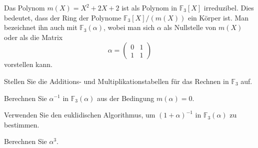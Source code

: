 Das Polynom $m(X)=X^2+2X+2$ ist als Polynom in $\mathbb{F}_3[X]$ irreduzibel.
Dies bedeutet, dass der Ring der Polynome $\mathbb{F}_3[X] / (m(X))$ 
ein Körper ist.
Man bezeichnet ihn auch mit $\mathbb{F}_3(\alpha)$,
wobei man sich $\alpha$ als Nullstelle von $m(X)$
oder als die Matrix
\[
\alpha = \begin{pmatrix} 0&1\\1&1\end{pmatrix}
\]
vorstellen kann.
\begin{teilaufgaben}
\item 
Stellen Sie die Additions- und Multiplikationstabellen für das Rechnen
in $\mathbb{F}_3$ auf.
\item
Berechnen Sie $\alpha^{-1}$ in $\mathbb{F}_3(\alpha)$ aus der
Bedingung $m(\alpha)=0$.
\item
Verwenden Sie den euklidischen Algorithmus, um $(1+\alpha)^{-1}$
in $\mathbb{F}_3(\alpha)$ zu bestimmen.
\item
Berechnen Sie $\alpha^3$.
\end{teilaufgaben}

